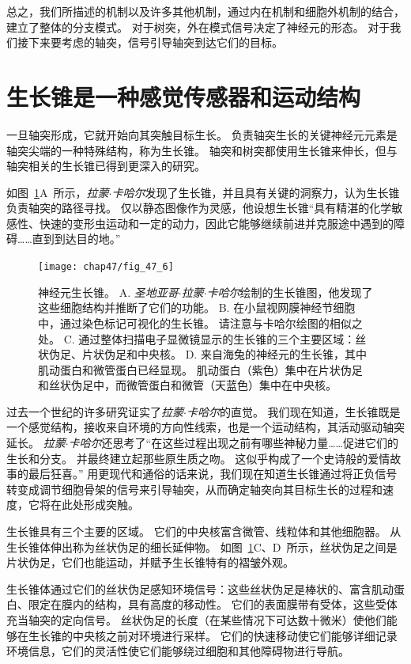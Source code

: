 总之，我们所描述的机制以及许多其他机制，通过内在机制和细胞外机制的结合，建立了整体的分支模式。
对于树突，外在模式信号决定了神经元的形态。
对于我们接下来要考虑的轴突，信号引导轴突到达它们的目标。



\section{生长锥是一种感觉传感器和运动结构}

一旦轴突形成，它就开始向其突触目标生长。
负责轴突生长的关键神经元元素是轴突尖端的一种特殊结构，称为生长锥。
轴突和树突都使用生长锥来伸长，但与轴突相关的生长锥已得到更深入的研究。


如图~\ref{fig:47_6}A~所示，\textit{拉蒙$\cdot$卡哈尔}发现了生长锥，并且具有关键的洞察力，认为生长锥负责轴突的路径寻找。
仅以静态图像作为灵感，他设想生长锥“具有精湛的化学敏感性、快速的变形虫运动和一定的动力，因此它能够继续前进并克服途中遇到的障碍……直到到达目的地。”


\begin{figure}[htbp]
	\centering
	\texttt{[image: chap47/fig\_47\_6]}
	\caption{神经元生长锥。
		A. \textit{圣地亚哥$\cdot$拉蒙$\cdot$卡哈尔}绘制的生长锥图，他发现了这些细胞结构并推断了它们的功能。
		B. 在小鼠视网膜神经节细胞中，通过染色标记可视化的生长锥。
		请注意与卡哈尔绘图的相似之处。
		C. 通过整体扫描电子显微镜显示的生长锥的三个主要区域：丝状伪足、片状伪足和中央核。
		D. 来自海兔的神经元的生长锥，其中肌动蛋白和微管蛋白已经显现。
		肌动蛋白（紫色）集中在片状伪足和丝状伪足中，而微管蛋白和微管（天蓝色）集中在中央核。}
	\label{fig:47_6}
\end{figure}


过去一个世纪的许多研究证实了\textit{拉蒙$\cdot$卡哈尔}的直觉。
我们现在知道，生长锥既是一个感觉结构，接收来自环境的方向性线索，也是一个运动结构，其活动驱动轴突延长。
\textit{拉蒙$\cdot$卡哈尔}还思考了“在这些过程出现之前有哪些神秘力量……促进它们的生长和分支。
并最终建立起那些原生质之吻。
这似乎构成了一个史诗般的爱情故事的最后狂喜。” 
用更现代和通俗的话来说，我们现在知道生长锥通过将正负信号转变成调节细胞骨架的信号来引导轴突，从而确定轴突向其目标生长的过程和速度，它将在此处形成突触。


生长锥具有三个主要的区域。
它们的中央核富含微管、线粒体和其他细胞器。
从生长锥体伸出称为丝状伪足的细长延伸物。
如图~\ref{fig:47_6}C、D~所示，丝状伪足之间是片状伪足，它们也能运动，并赋予生长锥特有的褶皱外观。


生长锥体通过它们的丝状伪足感知环境信号：这些丝状伪足是棒状的、富含肌动蛋白、限定在膜内的结构，具有高度的移动性。
它们的表面膜带有受体，这些受体充当轴突的定向信号。
丝状伪足的长度（在某些情况下可达数十微米）使他们能够在生长锥的中央核之前对环境进行采样。
它们的快速移动使它们能够详细记录环境信息，它们的灵活性使它们能够绕过细胞和其他障碍物进行导航。


